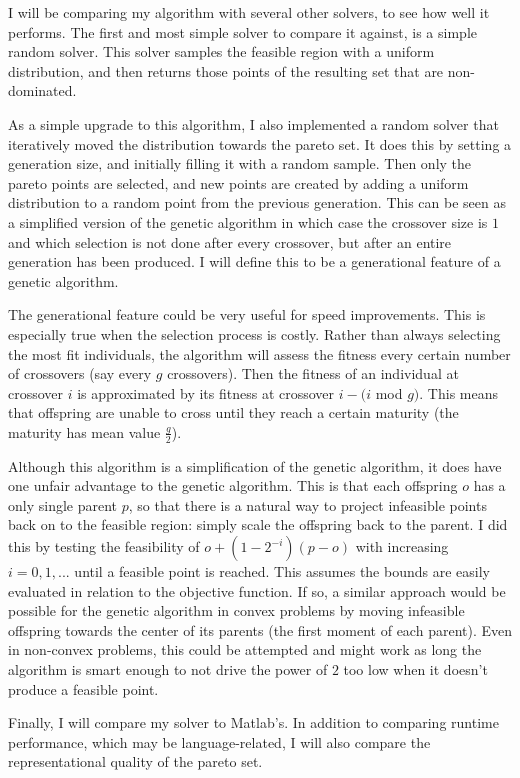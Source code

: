 \documentclass{article}
\begin{document}
I will be comparing my algorithm with several other solvers, to see how well it performs.
The first and most simple solver to compare it against, is a simple random solver.
This solver samples the feasible region with a uniform distribution, and then returns those points of the resulting set that are non-dominated.

As a simple upgrade to this algorithm, I also implemented a random solver that iteratively moved the distribution towards the pareto set.
It does this by setting a generation size, and initially filling it with a random sample.
Then only the pareto points are selected, and new points are created by adding a uniform distribution to a random point from the previous generation.
This can be seen as a simplified version of the genetic algorithm in which case the crossover size is $1$ and which selection is not done after every crossover, 
but after an entire generation has been produced.
I will define this to be a generational feature of a genetic algorithm.

The generational feature could be very useful for speed improvements.
This is especially true when the selection process is costly.
Rather than always selecting the most fit individuals, the algorithm will assess the fitness every certain number of crossovers (say every $g$ crossovers).
Then the fitness of an individual at crossover $i$ is approximated by its fitness at crossover $i - (i $ mod $ g)$.
This means that offspring are unable to cross until they reach a certain maturity (the maturity has mean value $\frac g 2$).

Although this algorithm is a simplification of the genetic algorithm, it does have one unfair advantage to the genetic algorithm.
This is that each offspring $o$ has a only single parent $p$, so that there is a natural way to project infeasible points back on to the feasible region: simply scale the offspring back to the parent.
I did this by testing the feasibility of $o + (1 - 2^{-i})(p - o)$ with increasing $i=0,1,...$ until a feasible point is reached.
This assumes the bounds are easily evaluated in relation to the objective function.
If so, a similar approach would be possible for the genetic algorithm in convex problems by moving infeasible offspring towards
the center of its parents (the first moment of each parent).
Even in non-convex problems, this could be attempted and might work as long the algorithm is smart enough to not drive the power of $2$ too low when it doesn't produce a feasible point.

Finally, I will compare my solver to Matlab's.
In addition to comparing runtime performance, which may be language-related, I will also compare the representational quality of the pareto set.
\end{document}
